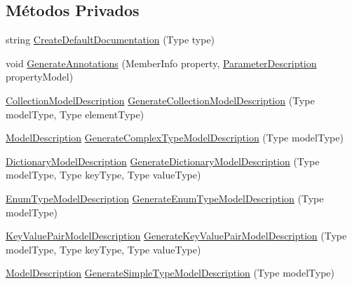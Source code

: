 \subsection*{Métodos Privados}
\begin{DoxyCompactItemize}
\item 
string \hyperlink{classApi3Layers_1_1Areas_1_1HelpPage_1_1ModelDescriptions_1_1ModelDescriptionGenerator_a64f78a7390688c87d31a887a9836beb4}{Create\+Default\+Documentation} (Type type)
\item 
void \hyperlink{classApi3Layers_1_1Areas_1_1HelpPage_1_1ModelDescriptions_1_1ModelDescriptionGenerator_ac38e76f941bb03e6602ec01872eaaa47}{Generate\+Annotations} (Member\+Info property, \hyperlink{classApi3Layers_1_1Areas_1_1HelpPage_1_1ModelDescriptions_1_1ParameterDescription}{Parameter\+Description} property\+Model)
\item 
\hyperlink{classApi3Layers_1_1Areas_1_1HelpPage_1_1ModelDescriptions_1_1CollectionModelDescription}{Collection\+Model\+Description} \hyperlink{classApi3Layers_1_1Areas_1_1HelpPage_1_1ModelDescriptions_1_1ModelDescriptionGenerator_aa65206c5e43db1c9d4c375539496f72d}{Generate\+Collection\+Model\+Description} (Type model\+Type, Type element\+Type)
\item 
\hyperlink{classApi3Layers_1_1Areas_1_1HelpPage_1_1ModelDescriptions_1_1ModelDescription}{Model\+Description} \hyperlink{classApi3Layers_1_1Areas_1_1HelpPage_1_1ModelDescriptions_1_1ModelDescriptionGenerator_a3d6912f5ad147d7d6683fba5d473a0ef}{Generate\+Complex\+Type\+Model\+Description} (Type model\+Type)
\item 
\hyperlink{classApi3Layers_1_1Areas_1_1HelpPage_1_1ModelDescriptions_1_1DictionaryModelDescription}{Dictionary\+Model\+Description} \hyperlink{classApi3Layers_1_1Areas_1_1HelpPage_1_1ModelDescriptions_1_1ModelDescriptionGenerator_ad8bba1e2e53b9d38faea81ca34b9ce92}{Generate\+Dictionary\+Model\+Description} (Type model\+Type, Type key\+Type, Type value\+Type)
\item 
\hyperlink{classApi3Layers_1_1Areas_1_1HelpPage_1_1ModelDescriptions_1_1EnumTypeModelDescription}{Enum\+Type\+Model\+Description} \hyperlink{classApi3Layers_1_1Areas_1_1HelpPage_1_1ModelDescriptions_1_1ModelDescriptionGenerator_a109bbcef4577be599414712bd9c04418}{Generate\+Enum\+Type\+Model\+Description} (Type model\+Type)
\item 
\hyperlink{classApi3Layers_1_1Areas_1_1HelpPage_1_1ModelDescriptions_1_1KeyValuePairModelDescription}{Key\+Value\+Pair\+Model\+Description} \hyperlink{classApi3Layers_1_1Areas_1_1HelpPage_1_1ModelDescriptions_1_1ModelDescriptionGenerator_a529f7a95c1863412ca1613c3cece0dc8}{Generate\+Key\+Value\+Pair\+Model\+Description} (Type model\+Type, Type key\+Type, Type value\+Type)
\item 
\hyperlink{classApi3Layers_1_1Areas_1_1HelpPage_1_1ModelDescriptions_1_1ModelDescription}{Model\+Description} \hyperlink{classApi3Layers_1_1Areas_1_1HelpPage_1_1ModelDescriptions_1_1ModelDescriptionGenerator_aa450e2d5fb6e71f7e40805ce495b18ab}{Generate\+Simple\+Type\+Model\+Description} (Type model\+Type)
\end{DoxyCompactItemize}
